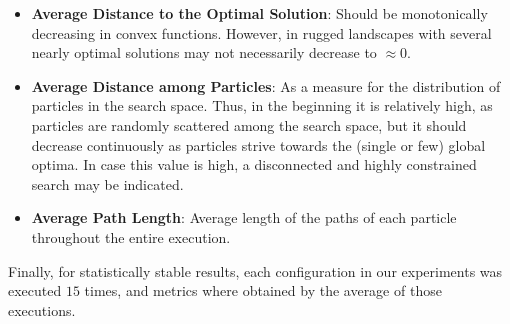 \documentclass[12pt]{article}
\begin{document}
\begin{itemize}
	
	\item \textbf{Average Distance to the Optimal Solution}: Should be monotonically decreasing in convex functions. However, in rugged landscapes with several nearly optimal solutions may not necessarily decrease to $\approx 0$.
	\item \textbf{Average Distance among Particles}: As a measure for the distribution of particles in the search space. 
	Thus, in the beginning it is relatively high, as particles are randomly scattered among the search space, but it should decrease continuously as particles strive towards the (single or few) global optima. 
	In case this value is high, a disconnected and highly constrained search may be indicated. 
	\item \textbf{Average Path Length}: Average length of the paths of each particle throughout the entire execution.
		
\end{itemize}

Finally, for statistically stable results, each configuration in our experiments was executed $15$ times, and metrics where obtained by the average of those executions.
%
%
%
\FloatBarrier
\end{document}
